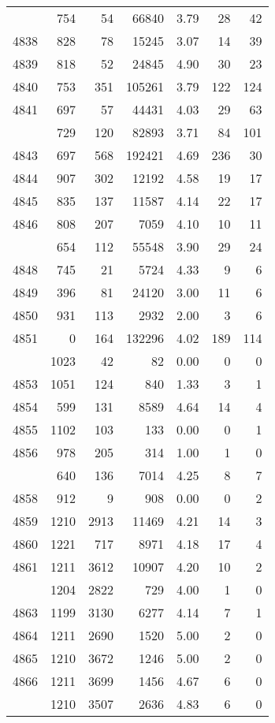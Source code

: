 \documentclass[
]{article}
\begin{document}
\begin{table}
\begin{tabular}[t]{lrrrrrr}
\addlinespace
4837 & 754 & 54 & 66840 & 3.79 & 28 & 42\\
4838 & 828 & 78 & 15245 & 3.07 & 14 & 39\\
4839 & 818 & 52 & 24845 & 4.90 & 30 & 23\\
4840 & 753 & 351 & 105261 & 3.79 & 122 & 124\\
4841 & 697 & 57 & 44431 & 4.03 & 29 & 63\\
\addlinespace
4842 & 729 & 120 & 82893 & 3.71 & 84 & 101\\
4843 & 697 & 568 & 192421 & 4.69 & 236 & 30\\
4844 & 907 & 302 & 12192 & 4.58 & 19 & 17\\
4845 & 835 & 137 & 11587 & 4.14 & 22 & 17\\
4846 & 808 & 207 & 7059 & 4.10 & 10 & 11\\
\addlinespace
4847 & 654 & 112 & 55548 & 3.90 & 29 & 24\\
4848 & 745 & 21 & 5724 & 4.33 & 9 & 6\\
4849 & 396 & 81 & 24120 & 3.00 & 11 & 6\\
4850 & 931 & 113 & 2932 & 2.00 & 3 & 6\\
4851 & 0 & 164 & 132296 & 4.02 & 189 & 114\\
\addlinespace
4852 & 1023 & 42 & 82 & 0.00 & 0 & 0\\
4853 & 1051 & 124 & 840 & 1.33 & 3 & 1\\
4854 & 599 & 131 & 8589 & 4.64 & 14 & 4\\
4855 & 1102 & 103 & 133 & 0.00 & 0 & 1\\
4856 & 978 & 205 & 314 & 1.00 & 1 & 0\\
\addlinespace
4857 & 640 & 136 & 7014 & 4.25 & 8 & 7\\
4858 & 912 & 9 & 908 & 0.00 & 0 & 2\\
4859 & 1210 & 2913 & 11469 & 4.21 & 14 & 3\\
4860 & 1221 & 717 & 8971 & 4.18 & 17 & 4\\
4861 & 1211 & 3612 & 10907 & 4.20 & 10 & 2\\
\addlinespace
4862 & 1204 & 2822 & 729 & 4.00 & 1 & 0\\
4863 & 1199 & 3130 & 6277 & 4.14 & 7 & 1\\
4864 & 1211 & 2690 & 1520 & 5.00 & 2 & 0\\
4865 & 1210 & 3672 & 1246 & 5.00 & 2 & 0\\
4866 & 1211 & 3699 & 1456 & 4.67 & 6 & 0\\
\addlinespace
4867 & 1210 & 3507 & 2636 & 4.83 & 6 & 0\\

\end{tabular}
\end{table}
\end{document}
